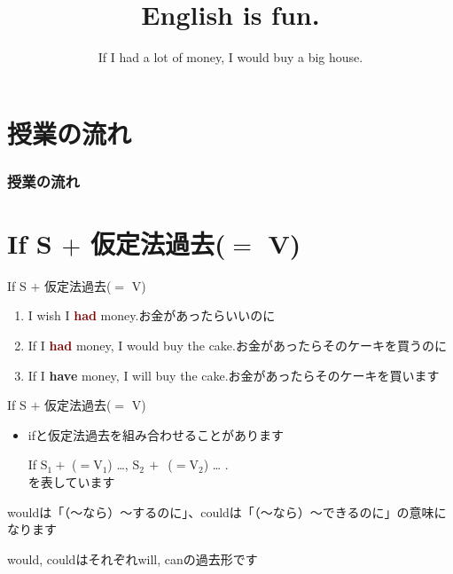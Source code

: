 \documentclass[aspectratio=169,xcolor={dvipsnames,table}]{beamer}
\title{English is fun.}
\subtitle{If I had a lot of money, I would buy a big house.}
\author{}
\institute[]{}
\date[]
\begin{document}
\begin{frame}[plain]
  \titlepage
\end{frame}

\section*{授業の流れ}
\begin{frame}[plain]
  \frametitle{授業の流れ}
  \tableofcontents
\end{frame}
\section{If S $+$ 仮定法過去($=$ V)}

\begin{frame}[plain]{If S $+$ 仮定法過去($=$ V)}
 \large
\begin{enumerate} 
 \item I wish I \textcolor{Maroon}{\bfseries had} money.\hfill{\scriptsize お金があったらいいのに}
 \item If I \textcolor{Maroon}{\bfseries had} money, I would buy the cake.\hfill{\scriptsize お金があったらそのケーキを買うのに}
 \item If I \textcolor{NavyBlue}{\bfseries have} money, I will buy the cake.\hfill{\scriptsize お金があったらそのケーキを買います}
\end{enumerate}


\begin{block}{If S $+$ 仮定法過去($=$ V)}
\small
\begin{itemize}[square]
 \item ifと仮定法過去を組み合わせることがあります\par
If $\text{S}_{1} +$ ($= \text{V}_{1}$) \ldots \hspace{2pt},\hspace{10pt}
 $\text{S}_{2}\,+$ \,($=\text{V}_{2}$) \ldots\hspace{2pt} .\\[10pt]
\hfill{}を表しています
\end{itemize}

\hfill{\scriptsize wouldは「（～なら）～するのに」、couldは「（～なら）～できるのに」の意味になります}

\hfill{\scriptsize would, couldはそれぞれwill, canの過去形です}
 

\end{block}
\end{frame}
\end{document}
